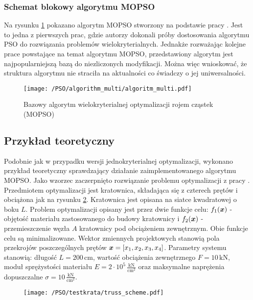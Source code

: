 \subsubsection{Schemat blokowy algorytmu MOPSO} \label{sect:MOPSO_algorithm}
Na rysunku \ref{fig: pso_multi_algorithm} pokazano algorytm MOPSO stworzony na podstawie pracy \parencite{CoelloCoello2002}. Jest to jedna z pierwszych prac, gdzie autorzy dokonali próby dostosowania algorytmu PSO do rozwiązania problemów wielokryterialnych. Jednakże rozważając kolejne prace powstające na temat algorytmu MOPSO, przedstawiony algorytm jest najpopularniejszą bazą do niezliczonych modyfikacji. Można więc wnioskować, że struktura algorytmu nie straciła na aktualności co świadczy o jej uniwersalności.
\begin{figure}[H]
	\centering
	\texttt{[image: /PSO/algorithm\_multi/algoritm\_multi.pdf]} 
	\captionsetup{justification=centering}
	\caption{Bazowy algorytm wielokryterialnej optymalizacji rojem cząstek (MOPSO)}
	\label{fig: pso_multi_algorithm}
\end{figure}


\subsection{Przykład teoretyczny}
Podobnie jak w przypadku wersji jednokryterialnej optymalizacji, wykonano przykład teoretyczny sprawdzający działanie zaimplementowanego algorytmu MOPSO. Jako wzorzec zaczerpnięto rozwiązanie problemu optymalizacji z pracy \parencite{Zavala2014}. Przedmiotem optymalizacji jest kratownica, składająca się z czterech prętów i obciążona jak na rysunku \ref{fig: pso_multi_testtruss}. Kratownica jest opisana na siatce kwadratowej o boku $L$. Problem optymalizacji opisany jest przez dwie funkcje celu: $f_1(\bm{x})$ - objętość materiału zastosowanego do budowy kratownicy i $f_2(\bm{x})$ - przemieszczenie węzła $A$ kratownicy pod obciążeniem zewnętrznym. Obie funkcje celu są minimalizowane. Wektor zmiennych projektowych stanowią pola przekrojów poszczególnych prętów $\bm{x}=[x_1,x_2,x_3,x_4]$. Parametry systemu stanowią: długość $L=200\,\text{cm}$, wartość obciążenia zewnętrznego $F=10\,\text{kN}$, moduł sprężystości materiału $E=2\cdot10^5\,\frac{\text{kN}}{\text{cm}^2}$ oraz maksymalne naprężenia dopuszczalne $\sigma=10\,\frac{\text{kN}}{\text{cm}^2}$.
\begin{figure}[h]
	\centering
	\texttt{[image: /PSO/testkrata/truss\_scheme.pdf]} 
	\captionsetup{justification=centering}
	\caption{}
	\label{fig: pso_multi_testtruss} 
\end{figure}

